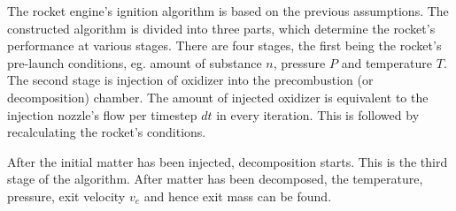   The rocket engine's ignition algorithm is based on the previous assumptions. The constructed algorithm is divided into three parts, which determine the rocket's performance at various stages. There are four stages, the first being the rocket's pre-launch conditions, eg. amount of substance $n$, pressure $P$ and temperature $T$. The second stage is injection of oxidizer into the precombustion (or decomposition) chamber. The amount of injected oxidizer is equivalent to the injection nozzle's flow per timestep $dt$ in every iteration. This is followed by recalculating the rocket's conditions.

  After the initial matter has been injected, decomposition starts. This is the third stage of the algorithm. After matter has been decomposed, the temperature, pressure, exit velocity $v_e$ and hence exit mass can be found.



